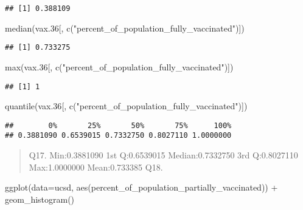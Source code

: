 \documentclass[
]{article}
\newenvironment{Shaded}{\begin{snugshade}}{\end{snugshade}}
\newcommand{\AttributeTok}[1]{\textcolor[rgb]{0.77,0.63,0.00}{#1}}
\newcommand{\FloatTok}[1]{\textcolor[rgb]{0.00,0.00,0.81}{#1}}
\newcommand{\FunctionTok}[1]{\textcolor[rgb]{0.00,0.00,0.00}{#1}}
\newcommand{\NormalTok}[1]{#1}
\newcommand{\SpecialCharTok}[1]{\textcolor[rgb]{0.00,0.00,0.00}{#1}}
\newcommand{\StringTok}[1]{\textcolor[rgb]{0.31,0.60,0.02}{#1}}
\begin{document}
\begin{verbatim}
## [1] 0.388109
\end{verbatim}

\begin{Shaded}
\begin{Highlighting}[]
\FunctionTok{median}\NormalTok{(vax}\FloatTok{.36}\NormalTok{[, }\FunctionTok{c}\NormalTok{(}\StringTok{"percent\_of\_population\_fully\_vaccinated"}\NormalTok{)])}
\end{Highlighting}
\end{Shaded}

\begin{verbatim}
## [1] 0.733275
\end{verbatim}

\begin{Shaded}
\begin{Highlighting}[]
\FunctionTok{max}\NormalTok{(vax}\FloatTok{.36}\NormalTok{[, }\FunctionTok{c}\NormalTok{(}\StringTok{"percent\_of\_population\_fully\_vaccinated"}\NormalTok{)])}
\end{Highlighting}
\end{Shaded}

\begin{verbatim}
## [1] 1
\end{verbatim}

\begin{Shaded}
\begin{Highlighting}[]
\FunctionTok{quantile}\NormalTok{(vax}\FloatTok{.36}\NormalTok{[, }\FunctionTok{c}\NormalTok{(}\StringTok{"percent\_of\_population\_fully\_vaccinated"}\NormalTok{)])}
\end{Highlighting}
\end{Shaded}

\begin{verbatim}
##        0%       25%       50%       75%      100% 
## 0.3881090 0.6539015 0.7332750 0.8027110 1.0000000
\end{verbatim}

\begin{quote}
Q17. Min:0.3881090 1st Q:0.6539015 Median:0.7332750 3rd Q:0.8027110
Max:1.0000000 Mean:0.733385 Q18.
\end{quote}

\begin{Shaded}
\begin{Highlighting}[]
\FunctionTok{ggplot}\NormalTok{(}\AttributeTok{data=}\NormalTok{ucsd, }\FunctionTok{aes}\NormalTok{(percent\_of\_population\_partially\_vaccinated)) }\SpecialCharTok{+} \FunctionTok{geom\_histogram}\NormalTok{()}
\end{Highlighting}
\end{Shaded}
\end{document}
